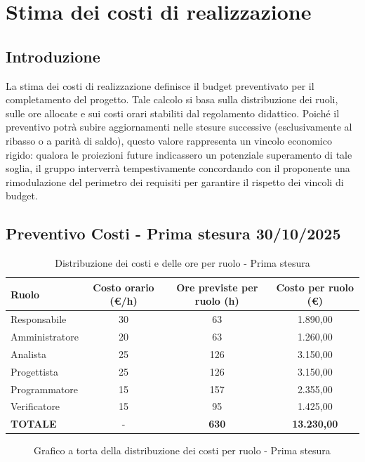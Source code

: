 \documentclass[a4paper, 11pt, oneside]{scrartcl} %
\begin{document}
\newpage
\section{Stima dei costi di realizzazione}

\subsection{Introduzione}
La stima dei costi di realizzazione definisce il budget preventivato per il completamento del progetto. Tale calcolo si basa sulla distribuzione dei ruoli, sulle ore allocate e sui costi orari stabiliti dal regolamento didattico.
Poiché il preventivo{\scriptsize{}} potrà subire aggiornamenti nelle stesure successive (esclusivamente al ribasso o a parità di saldo), questo valore rappresenta un vincolo economico rigido: qualora le proiezioni future indicassero un potenziale superamento di tale soglia, il gruppo interverrà tempestivamente concordando con il proponente una rimodulazione del perimetro dei requisiti per garantire il rispetto dei vincoli di budget.

\subsection{Preventivo Costi - Prima stesura 30/10/2025}
\begin{table}[!ht]
\centering
\renewcommand{\arraystretch}{1.4}
\begin{tabularx}{\textwidth}{L c c c}
\toprule
\textbf{Ruolo} & \textbf{Costo orario (€/h)} & \textbf{Ore previste per ruolo (h)} & \textbf{Costo per ruolo (€)} \\
\midrule
Responsabile & 30 & 63 & 1.890,00 \\
Amministratore & 20 & 63 & 1.260,00 \\
Analista & 25 & 126 & 3.150,00 \\
Progettista & 25 & 126 & 3.150,00 \\
Programmatore & 15 & 157 & 2.355,00 \\
Verificatore & 15 & 95 & 1.425,00 \\
\midrule
\textbf{TOTALE} & - & \textbf{630} & \textbf{13.230,00} \\
\bottomrule
\end{tabularx}
\caption{Distribuzione dei costi e delle ore per ruolo - Prima stesura}
\label{tab_fig_distribuzione_dei_costi_e_dell}
\end{table}

\begin{figure}[!ht]
\centering
{}
\caption{Grafico a torta della distribuzione dei costi per ruolo - Prima stesura}
\label{tab_fig_grafico_a_torta_della_distribu}
\end{figure}
\end{document}
